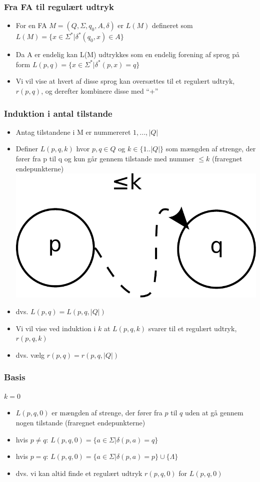 \begin{frame}
\frametitle{Fra FA til regulært udtryk}
\begin{itemize}[<+->]
\item For en FA $M=(Q, \Sigma , q_0, A, \delta )$ er $L(M)$ defineret som
	$L(M) = \{ x\in \Sigma^* | \delta^*(q_0, x)\in A \}$
\item Da A er endelig kan L(M) udtrykkes som en endelig forening af sprog på form
	 $L(p, q) = \{ x\in \Sigma^* | \delta^*(p, x)=q \}$
\item Vi vil vise at hvert af disse sprog kan oversættes til et regulært udtryk, $r(p, q)$, og derefter kombinere disse med “+”
\end{itemize}
\end{frame}
\begin{frame}
\frametitle{Induktion i antal tilstande}
\begin{itemize}[<+->]
\item Antag tilstandene i M er nummereret $1, ..., |Q|$
\item Definer $L(p, q, k)$ hvor $p,q\in Q$ og $k\in \{1..|Q|\}$ som
  mængden af strenge, der fører fra p til q og kun går gennem
  tilstande med nummer $\leq k$ (fraregnet endepunkterne)
  \includegraphics[scale=0.2]{images/2_seminar_kleene_2_lessk}
\item dvs.  $L(p, q) = L(p, q, |Q|)$
\item Vi vil vise ved induktion i $k$ at $L(p, q, k)$ svarer til 
et regulært udtryk, $r(p, q, k)$
\item dvs. vælg  $r(p, q) = r(p, q, |Q|)$
\end{itemize}
\end{frame}
\begin{frame}
\frametitle{Basis}
$k = 0$
\begin{itemize}[<+->]
\item 
$L(p, q, 0)$ er mængden af strenge, der fører fra 
$p$ til $q$ uden at gå gennem nogen tilstande 
(fraregnet endepunkterne)
\item
hvis $p\neq q$: 
$L(p, q, 0) = \{ a\in \Sigma  | \delta (p, a) = q \}$
\item
hvis $p=q$: 
$L(p, q, 0) = \{ a\in \Sigma  | \delta (p, a) = p \} \cup \{\Lambda\}$
\item
dvs. vi kan altid finde et regulært udtryk 
$r(p, q, 0)$ for $L(p, q, 0)$
\end{itemize}
\end{frame}
